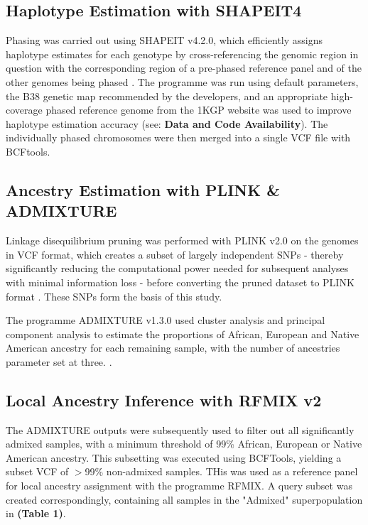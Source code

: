 \documentclass[11pt]{article}
\begin{document}
\subsection{Haplotype Estimation with SHAPEIT4}



Phasing was carried out using SHAPEIT v4.2.0, which efficiently assigns haplotype estimates for each genotype by cross-referencing the genomic region in question with the corresponding region of a pre-phased reference panel and of the other genomes being phased \parencite{Delaneau2019}. The programme was run using default parameters, the B38 genetic map recommended by the developers, and an appropriate high-coverage phased reference genome from the 1KGP website was used to improve haplotype estimation accuracy (see: \textbf{Data and Code Availability}). The individually phased chromosomes were then merged into a single VCF file with BCFtools. 





\subsection{Ancestry Estimation with PLINK \& ADMIXTURE}


Linkage disequilibrium pruning was performed with PLINK v2.0 on the genomes in VCF format, which creates a subset of largely independent SNPs - thereby significantly reducing the computational power needed for subsequent analyses with minimal information loss - before converting the pruned dataset to PLINK format \parencite{Purcell2007}. These SNPs form the basis of this study.

The programme ADMIXTURE v1.3.0 used cluster analysis and principal component analysis to estimate the proportions of African, European and Native American ancestry for each remaining sample, with the number of ancestries parameter set at three. \parencite{Alexander2009}.





\subsection{Local Ancestry Inference with RFMIX v2}



The ADMIXTURE outputs were subsequently used to filter out all significantly admixed samples, with a minimum threshold of 99\% African, European or Native American ancestry. This subsetting was executed using BCFTools, yielding a subset VCF of $>$99\% non-admixed samples. THis was used as a reference panel for local ancestry assignment with the programme RFMIX. A query subset was created correspondingly, containing all samples in the "Admixed" superpopulation in \textbf{(Table 1)}.
\end{document}
